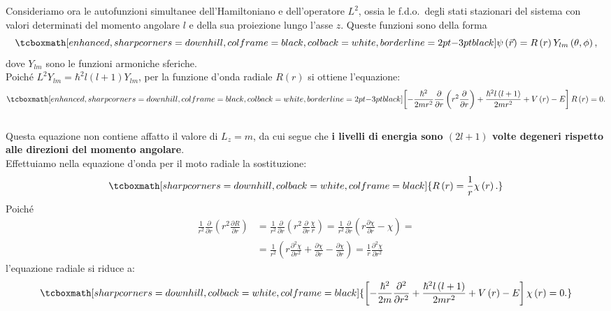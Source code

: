Consideriamo ora le autofunzioni simultanee dell'Hamiltoniano e dell'operatore $L^2$, ossia le f.d.o.~degli stati stazionari del sistema con valori determinati del momento angolare $l$ e della sua proiezione lungo l'asse $z$. Queste funzioni sono della forma
	\begin{equation}
		\tcboxmath[enhanced, sharp corners=downhill, colframe=black, colback=white, borderline={2pt}{-3pt}{black}]{
			\psi\left(\vec{r}\right)=R\left(r\right)Y_{lm}\left(\theta,\phi\right) ,
			}
	\end{equation}
dove $Y_{lm}$ sono le funzioni armoniche sferiche.\\

Poiché $L^2Y_{lm}=\hbar^2l\left(l+1\right)Y_{lm}$, per la funzione d'onda radiale $R\left(r\right)$ si ottiene l'equazione:
	\begin{equation}
		\tcboxmath[enhanced, sharp corners=downhill, colframe=black, colback=white, borderline={2pt}{-3pt}{black}]{
			\left[-\frac{\hbar^2}{2mr^2}\frac{\partial}{\partial r}\left(r^2\frac{\partial}{\partial r}\right)+\frac{\hbar^2l\left(l+1\right)}{2mr^2}+V\left(r\right)-E\right]R\left(r\right)=0 .
			}
	\end{equation}\\
	
Questa equazione non contiene affatto il valore di $L_z=m$, da cui segue che \textbf{i livelli di energia sono $\left(2l+1\right)$ volte degeneri rispetto alle direzioni del momento angolare}.\\

Effettuiamo nella equazione d'onda per il moto radiale la sostituzione:
	\begin{equation}
		\tcboxmath[sharp corners=downhill, colback=white, colframe=black]{
			R\left(r\right)=\frac{1}{r}\chi\left(r\right) .
			}
	\end{equation}
Poiché
	\begin{align}
		\frac{1}{r^2}\frac{\partial}{\partial r}\left(r^2\frac{\partial R}{\partial r}\right)&=\frac{1}{r^2}\frac{\partial}{\partial r}\left(r^2\frac{\partial}{\partial r}\frac{\chi}{r}\right)=\frac{1}{r^2}\frac{\partial}{\partial r}\left(r \frac{\partial\chi}{\partial r}-\chi\right)= \nonumber \\
		&= \frac{1}{r^2}\left(r\frac{\partial^2\chi}{\partial r^2}+\frac{\partial\chi}{\partial r}-\frac{\partial\chi}{\partial r}\right) = \frac{1}{r}\frac{\partial^2 \chi}{\partial r^2}
\end{align}
l'equazione radiale si riduce a:
	\begin{equation}
		\tcboxmath[sharp corners=downhill, colback=white, colframe=black]{
			\left[-\frac{\hbar^2}{2m}\frac{\partial^2}{\partial r^2}+\frac{\hbar^2l\left(l+1\right)}{2mr^2}+V\left(r\right)-E\right]\chi\left(r\right)=0 .
			}
	\end{equation}\\

